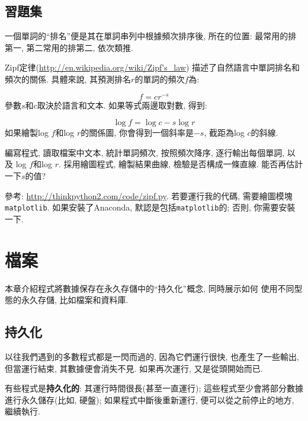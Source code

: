 \documentclass[10pt]{book}
\begin{document}
\section{習題集}

\begin{exercise}

一個單詞的``排名''便是其在單詞串列中根據頻次排序後, 所在的位置:
最常用的排第一, 第二常用的排第二, 依次類推. 

Zipf定律(\url{http://en.wikipedia.org/wiki/Zipf's_law})
描述了自然語言中單詞排名和頻次的關係. 
具體來說, 其預測排名$r$的單詞的頻次$f$為:

\[ f = c r^{-s} \]
%
參數$s$和$c$取決於語言和文本. 
如果等式兩邊取對數, 得到:

\[ \log f = \log c - s \log r \]
%
如果繪製log $f$和log $r$的關係圖, 你會得到一個斜率是$-s$, 截距為log $c$的斜線. 

編寫程式, 讀取檔案中文本, 
統計單詞頻次, 按照頻次降序, 逐行輸出每個單詞, 以及
log $f$和log $r$. 
採用繪圖程式, 繪製結果曲線, 檢驗是否構成一條直線. 
能否再估計一下$s$的值?

參考: \url{http://thinkpython2.com/code/zipf.py}.
若要運行我的代碼, 需要繪圖模塊{\tt matplotlib}.
如果安裝了Anaconda, 默認是包括{\tt matplotlib}的;
否則, 你需要安裝一下. 

\end{exercise}



\chapter{檔案}

本章介紹程式將數據保存在永久存儲中的``持久化''概念, 同時展示如何
使用不同型態的永久存儲, 比如檔案和資料庫. 


\section{持久化}

以往我們遇到的多數程式都是一閃而過的, 因為它們運行很快, 也產生了一些輸出, 
但當運行結束, 其數據便會消失不見. 
如果再次運行, 又是從頭開始而已. 

有些程式是{\bf 持久化的}: 其運行時間很長(甚至一直運行);
這些程式至少會將部分數據進行永久儲存(比如, 硬盤);
如果程式中斷後重新運行, 便可以從之前停止的地方, 繼續執行. 
\end{document}
